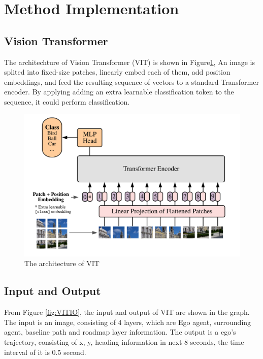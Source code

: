 \documentclass[10pt,conference,compsocconf]{IEEEtran}
\begin{document}
\section{Method Implementation}

\subsection{Vision Transformer}
The architechture of Vision Transformer (VIT) is shown in Figure\ref{fig:VIT}, An image is splited into fixed-size patches, linearly embed each of them, add position embeddings, and feed the resulting sequence of vectors to a standard Transformer encoder. By applying adding an extra learnable classification token to the sequence, it could perform classification.\cite{VIT}

\begin{figure}[!ht]
	\centering
	\includegraphics[width=0.9\linewidth]{VIT.png}
	\caption{The architecture of VIT}
    \label{fig:VIT}
\end{figure}
\subsection{Input and Output}

From Figure \ref{fig:VITIO}, the input and output of VIT are shown in the graph. The input is an image, consisting of 4 layers, which are Ego agent, surrounding agent, baseline path and roadmap layer information. The output is a ego's trajectory, consisting of x, y, heading information in next 8 seconds, the time interval of it is 0.5 second.
\end{document}
